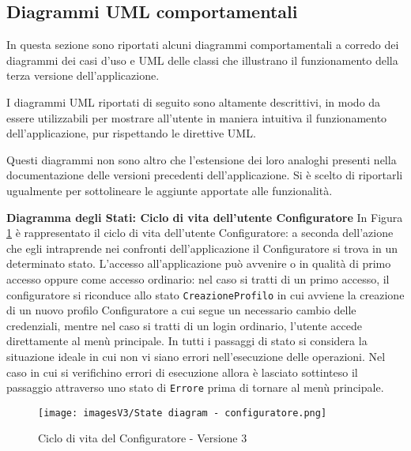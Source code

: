 \newpage
\subsection{Diagrammi UML comportamentali}
In questa sezione sono riportati alcuni diagrammi comportamentali a corredo dei diagrammi dei casi d'uso e UML delle classi che illustrano il funzionamento della terza versione dell'applicazione.

I diagrammi UML riportati di seguito sono altamente descrittivi, in modo da essere utilizzabili per mostrare all'utente in maniera intuitiva il funzionamento dell'applicazione, pur rispettando le direttive UML.

Questi diagrammi non sono altro che l'estensione dei loro analoghi presenti nella documentazione delle versioni precedenti dell'applicazione. Si è scelto di riportarli ugualmente per sottolineare le aggiunte apportate alle funzionalità.\bigskip

\textbf{Diagramma degli Stati: Ciclo di vita dell'utente Configuratore}\newline
In Figura \ref{fig:State diagram 3.1} è rappresentato il ciclo di vita dell'utente Configuratore: a seconda dell'azione che egli intraprende nei confronti dell'applicazione il Configuratore si trova in un determinato stato.\newline 
L'accesso all'applicazione può avvenire o in qualità di primo accesso oppure come accesso ordinario: nel caso si tratti di un primo accesso, il configuratore si riconduce allo stato \texttt{CreazioneProfilo} in cui avviene la creazione di un nuovo profilo Configuratore a cui segue un necessario cambio delle credenziali, mentre nel caso si tratti di un login ordinario, l'utente accede direttamente al menù principale. \newline 
In tutti i passaggi di stato si considera la situazione ideale in cui non vi siano errori nell'esecuzione delle operazioni. Nel caso in cui si verifichino errori di esecuzione allora è lasciato sottinteso il passaggio attraverso uno stato di \texttt{Errore} prima di tornare al menù principale.

\begin{figure}[h!]
\centering
\texttt{[image: imagesV3/State diagram - configuratore.png]}
\caption{\label{fig:State diagram 3.1}Ciclo di vita del Configuratore - Versione 3}
\end{figure}\bigskip


